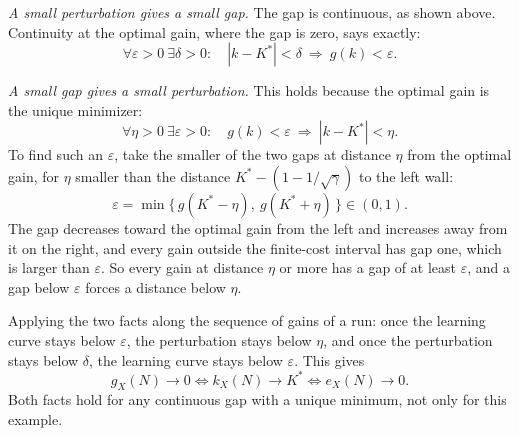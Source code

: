 \documentclass[11pt]{article}
\begin{document}
\emph{A small perturbation gives a small gap.} The gap is continuous, as shown above. Continuity at
the optimal gain, where the gap is zero, says exactly:
\[
  \forall \varepsilon > 0 \ \exists \delta > 0 : \quad
  |k - K^*| < \delta \ \Longrightarrow\ g(k) < \varepsilon .
\]

\emph{A small gap gives a small perturbation.} This holds because the optimal gain is the unique
minimizer:
\[
  \forall \eta > 0 \ \exists \varepsilon > 0 : \quad
  g(k) < \varepsilon \ \Longrightarrow\ |k - K^*| < \eta .
\]
To find such an $\varepsilon$, take the smaller of the two gaps at distance $\eta$ from the optimal
gain, for $\eta$ smaller than the distance $K^* - (1 - 1/\sqrt{\gamma})$ to the left wall:
\[
  \varepsilon = \min\big\{\, g(K^* - \eta),\ g(K^* + \eta) \,\big\} \in (0, 1) .
\]
The gap decreases toward the optimal gain from the left and increases away from it on the right, and
every gain outside the finite-cost interval has gap one, which is larger than $\varepsilon$. So every gain
at distance $\eta$ or more has a gap of at least $\varepsilon$, and a gap below $\varepsilon$ forces a
distance below $\eta$.

Applying the two facts along the sequence of gains of a run: once the learning curve stays below
$\varepsilon$, the perturbation stays below $\eta$, and once the perturbation stays below $\delta$,
the learning curve stays below $\varepsilon$. This gives
\[
  g_X(N) \to 0 \iff k_X(N) \to K^* \iff e_X(N) \to 0 .
\]
Both facts hold for any continuous gap with a unique minimum, not only for this example.
\end{document}

